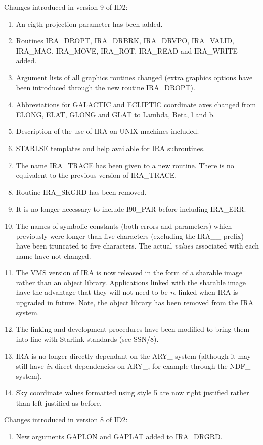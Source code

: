Changes introduced in version 9 of ID2:
\begin {enumerate}
\item An eigth projection parameter has been added.
\item Routines IRA\_DROPT, IRA\_DRBRK, IRA\_DRVPO, IRA\_VALID, IRA\_MAG, 
IRA\_MOVE, IRA\_ROT, IRA\_READ and IRA\_WRITE added.
\item Argument lists of all graphics routines changed (extra graphics options 
have been introduced through the new routine IRA\_DROPT).
\item Abbreviations for GALACTIC and ECLIPTIC coordinate axes changed from
ELONG, ELAT, GLONG and GLAT to Lambda, Beta, l and b.
\item Description of the use of IRA on UNIX machines included.
\item STARLSE templates and help available for IRA subroutines.
\item The name IRA\_TRACE has been given to a new routine. There is no 
equivalent to the previous version of IRA\_TRACE.
\item Routine IRA\_SKGRD has been removed.
\item It is no longer necessary to include I90\_PAR before including
IRA\_ERR.
\item The names of symbolic constants (both errors and parameters) which previously 
were longer than five characters (excluding the IRA\_\_ prefix) have been
truncated to five characters. The actual {\em values} associated with each name 
have not changed.
\item The VMS version of IRA is now released in the form of a sharable image 
rather than an object library. Applications linked with the sharable image have 
the advantage that they will not need to be {\em re}-linked when IRA is upgraded 
in future. Note, the object library has been removed from the IRA system.
\item The linking and development procedures have been modified to bring them 
into line with Starlink standards (see SSN/8).
\item IRA is no longer directly dependant on the ARY\_ system (although it may
still have {\em in}-direct dependencies on ARY\_, for example through the
NDF\_ system).
\item Sky coordinate values formatted using style 5 are now right justified
rather than left justified as before.

\end {enumerate}

Changes introduced in version 8 of ID2:
\begin {enumerate}
\item New arguments GAPLON and GAPLAT added to IRA\_DRGRD.
\end {enumerate}

